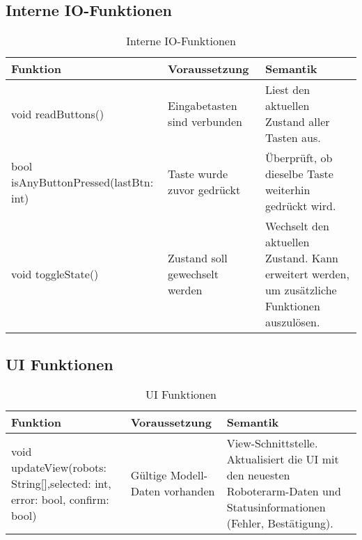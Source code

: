 \subsection{Interne IO-Funktionen}
\begin{table}[h!]
    \centering
    \begin{tabular}{|p{5cm}|p{5cm}|p{5cm}|}
        \hline
        \textbf{Funktion} & \textbf{Voraussetzung} & \textbf{Semantik} \\
        \hline
        void readButtons() & Eingabetasten sind verbunden & Liest den aktuellen Zustand aller Tasten aus. \\
        \hline
        bool isAnyButtonPressed(lastBtn: int) & Taste wurde zuvor gedrückt & Überprüft, ob dieselbe Taste weiterhin gedrückt wird.\\
        \hline
        void toggleState() & Zustand soll gewechselt werden & Wechselt den aktuellen Zustand. Kann erweitert werden, um zusätzliche Funktionen auszulösen. \\
        \hline
    \end{tabular}
    \caption{Interne IO-Funktionen}
    \label{tab:interneIOFunktionen}
\end{table}


\clearpage
\subsection{UI Funktionen}
\begin{table}[h!]
    \centering
    \begin{tabular}{|p{5cm}|p{5cm}|p{5cm}|}
        \hline
        \textbf{Funktion} & \textbf{Voraussetzung} & \textbf{Semantik} \\
        \hline
        void updateView(robots: String[],selected: int, error: bool, confirm: bool) & Gültige Modell-Daten vorhanden & View-Schnittstelle. Aktualisiert die UI mit den neuesten Roboterarm-Daten und Statusinformationen (Fehler, Bestätigung). \\ 
        \hline
    \end{tabular}
    \caption{UI Funktionen}
    \label{tab:UIFunktionen}
\end{table}


